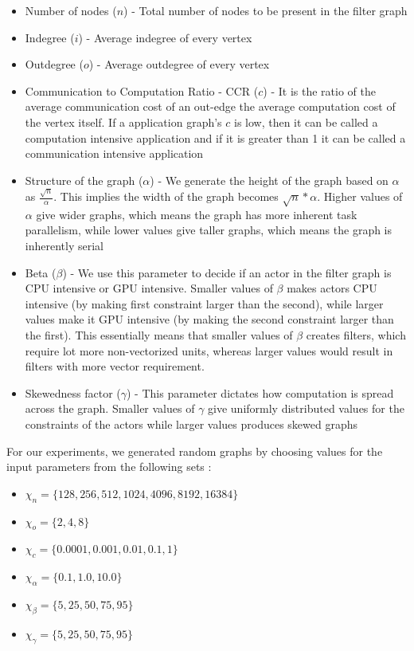 \begin{itemize}
\item Number of nodes ($n$) - Total number of nodes to be present in the
  filter graph
\item Indegree ($i$) - Average indegree of every vertex
\item Outdegree ($o$) - Average outdegree of every vertex
\item Communication to Computation Ratio - CCR ($c$) - It is the ratio
  of the average communication cost of an out-edge the average
  computation cost of the vertex itself. If a application graph's $c$ is low, then it
  can be called a computation intensive application and if it is greater
  than 1 it can be called a communication intensive application
\item Structure of the graph ($\alpha$) - We generate the height of the
  graph based on $\alpha$ as $\frac{\sqrt{n}}{\alpha}$. This implies the
  width of the graph becomes $\sqrt{n}*{\alpha}$. Higher values of
  $\alpha$ give wider graphs, which means the graph has more inherent
  task parallelism, while lower values give taller graphs, which means
  the graph is inherently serial
\item Beta ($\beta$) - We use this parameter to decide if an actor in
  the filter graph is CPU intensive or GPU intensive. Smaller values of
  $\beta$ makes actors CPU intensive (by making first constraint larger
  than the second), while larger values make it GPU intensive (by making
  the second constraint larger than the first). This essentially means
  that smaller values of $\beta$ creates filters, which require lot more
  non-vectorized units, whereas larger values would result in filters
  with more vector requirement.
\item Skewedness factor ($\gamma$) - This parameter dictates how
  computation is spread across the graph. Smaller values of $\gamma$
  give uniformly distributed values for the constraints of the actors
  while larger values produces skewed graphs
\end{itemize}

For our experiments, we generated random graphs by choosing values for
the input parameters from the following sets :

\begin{itemize}
\item $\chi_{n} = \{128, 256, 512, 1024, 4096, 8192, 16384\}$
\item $\chi_{o} = \{2, 4, 8\}$
\item $\chi_{c} = \{0.0001, 0.001, 0.01, 0.1, 1\}$
\item $\chi_{\alpha} = \{0.1, 1.0, 10.0\}$
\item $\chi_{\beta} = \{5, 25, 50, 75, 95\}$
\item $\chi_{\gamma} = \{5, 25, 50, 75, 95\}$
\end{itemize}

